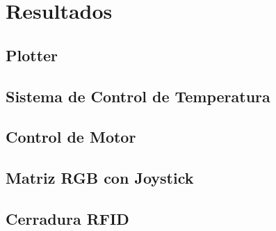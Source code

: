 \section{Resultados}

\subsection{Plotter}

\subsection{Sistema de Control de Temperatura}

\subsection{Control de Motor }

\subsection{Matriz RGB con Joystick}

\subsection{Cerradura RFID}